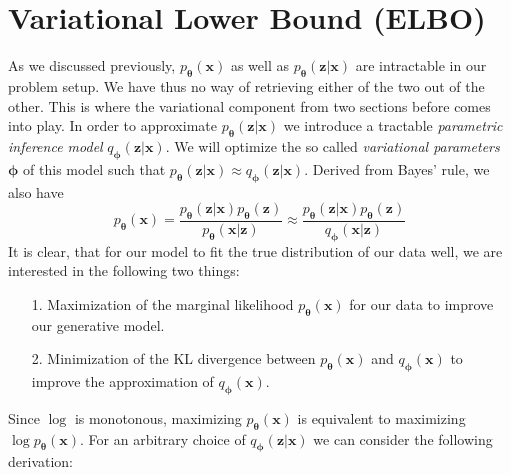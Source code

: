 \documentclass[12pt]{report}
\theoremstyle{definition}
\begin{document}
\section{Variational Lower Bound (ELBO)}
As we discussed previously, $p_{\mathbf{\theta}}(\mathbf{x})$ as well as $p_{\mathbf{\theta}}(\mathbf{z}|\mathbf{x})$ are intractable in our problem setup. We have thus no way of retrieving either of the two out of the other. This is where the variational component from two sections before comes into play. In order to approximate $p_{\mathbf{\theta}}(\mathbf{z}|\mathbf{x})$ we introduce a tractable \emph{parametric inference model} $q_{\mathbf{\phi}}(\mathbf{z}|\mathbf{x})$. We will optimize the so called \emph{variational parameters} $\pmb{\phi}$ of this model such that $p_{\mathbf{\theta}}(\mathbf{z}|\mathbf{x}) \approx q_{\mathbf{\phi}}(\mathbf{z}|\mathbf{x})$.
Derived from Bayes' rule, we also have
\begin{equation}
	p_{\mathbf{\theta}}(\mathbf{x}) = \frac{p_{\mathbf{\theta}}(\mathbf{z}|\mathbf{x}) p_{\mathbf{\theta}}(\mathbf{z})}{p_{\mathbf{\theta}}(\mathbf{x}|\mathbf{z})} \approx  \frac{p_{\mathbf{\theta}}(\mathbf{z}|\mathbf{x}) p_{\mathbf{\theta}}(\mathbf{z})}{q_{\mathbf{\phi}}(\mathbf{x}|\mathbf{z})}
\end{equation}
It is clear, that for our model to fit the true distribution of our data well, we are interested in the following two things:
\begin{itemize}
	\item[1.] Maximization of the marginal likelihood $p_{\mathbf{\theta}}(\mathbf{x})$ for our data to improve our generative model.
	\item[2.] Minimization of the KL divergence between $p_{\mathbf{\theta}}(\mathbf{x})$ and $q_{\mathbf{\phi}}(\mathbf{x})$ to improve the approximation of $q_{\mathbf{\phi}}(\mathbf{x})$.
\end{itemize}
Since $\log$ is monotonous, maximizing $p_{\mathbf{\theta}}(\mathbf{x})$ is equivalent to maximizing $\log p_{\mathbf{\theta}}(\mathbf{x})$. For an arbitrary choice of $q_{\mathbf{\phi}}(\mathbf{z}|\mathbf{x})$ we can consider the following derivation:
\end{document}

